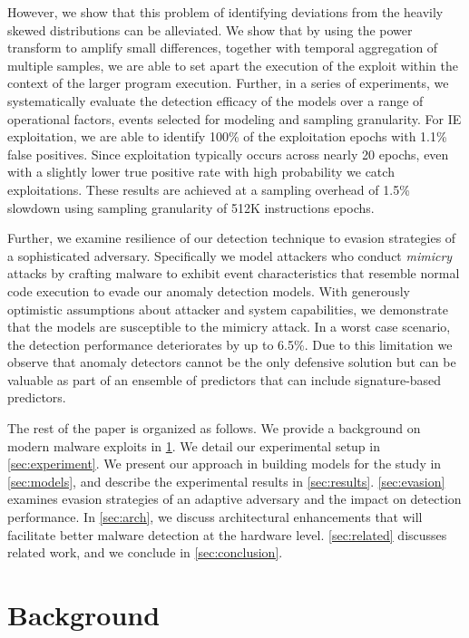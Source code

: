 \documentclass{acm_proc_article-sp}
\begin{document}
However, we show that this problem of identifying deviations from
the heavily skewed distributions can be alleviated.  We show that
by using the power transform to amplify small differences, together with
temporal aggregation of multiple samples, we are able to set apart
the execution of the exploit within the context of the larger program
execution.  Further, in a series of experiments, we systematically
evaluate the detection efficacy of the models over a range of
operational factors, events selected for modeling and sampling
granularity. For IE exploitation, we are able to identify 100\% of the exploitation epochs with 1.1\% false positives. Since exploitation typically occurs across nearly 20 epochs, even with a slightly lower true positive rate with high probability we catch exploitations.
 These results are achieved at
a sampling overhead of 1.5\% slowdown using sampling granularity
of 512K instructions epochs.

Further, we examine resilience of our detection technique to evasion
strategies of a sophisticated adversary.  Specifically we model
attackers who conduct \textit{mimicry} attacks by crafting malware
to exhibit event characteristics that resemble normal code execution
to evade our anomaly detection models.  With generously optimistic
assumptions about attacker and system capabilities,  we demonstrate
that the models are susceptible to the mimicry attack.  In a worst
case scenario, the detection performance deteriorates by up to
6.5\%.  Due to this limitation we observe that anomaly detectors
cannot be the only defensive solution but can be valuable as part
of an ensemble of predictors that can include signature-based
predictors.

The rest of the paper is organized as follows. We provide a background 
on modern malware exploits in \ref{sec:background}. We detail our 
experimental setup in \ref{sec:experiment}. We present our approach in 
building models for the study in \ref{sec:models}, and describe
the experimental results in \ref{sec:results}. \ref{sec:evasion} examines  
evasion strategies of an adaptive adversary and the impact on
detection performance. In \ref{sec:arch}, we discuss architectural 
enhancements that will facilitate better malware detection 
at the hardware level. \ref{sec:related} discusses related work, and 
we conclude in \ref{sec:conclusion}.



\section{Background}
\label{sec:background}
\end{document}

